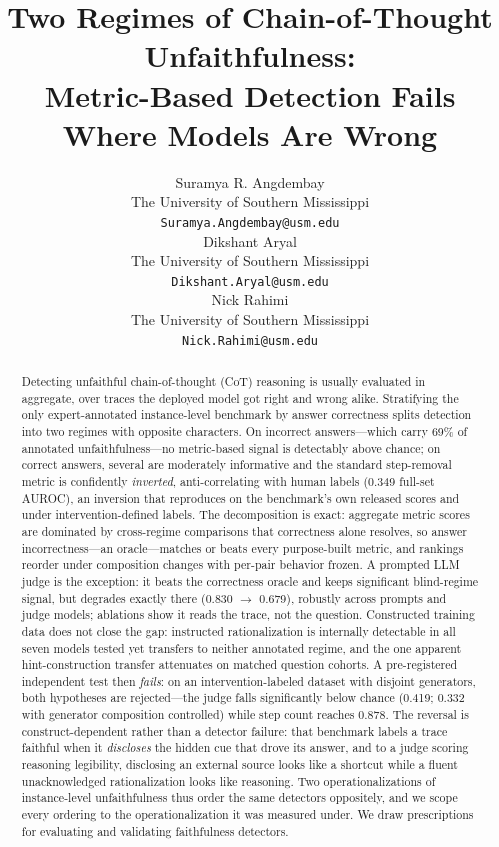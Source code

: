 \documentclass[11pt]{article}
\title{Two Regimes of Chain-of-Thought Unfaithfulness:\\Metric-Based Detection Fails Where Models Are Wrong}
\author{Suramya R. Angdembay \\
  The University of Southern Mississippi \\
  \texttt{Suramya.Angdembay@usm.edu} \\\And
  Dikshant Aryal \\
  The University of Southern Mississippi \\
  \texttt{Dikshant.Aryal@usm.edu} \\\And
  Nick Rahimi \\
  The University of Southern Mississippi \\
  \texttt{Nick.Rahimi@usm.edu} \\}
\begin{document}
\maketitle

\begin{abstract}
Detecting unfaithful chain-of-thought (CoT) reasoning is usually evaluated in aggregate, over traces the deployed model got right and wrong alike. Stratifying the only expert-annotated instance-level benchmark by answer correctness splits detection into two regimes with opposite characters. On incorrect answers---which carry 69\% of annotated unfaithfulness---no metric-based signal is detectably above chance; on correct answers, several are moderately informative and the standard step-removal metric is confidently \emph{inverted}, anti-correlating with human labels (0.349 full-set AUROC), an inversion that reproduces on the benchmark's own released scores and under intervention-defined labels. The decomposition is exact: aggregate metric scores are dominated by cross-regime comparisons that correctness alone resolves, so answer incorrectness---an oracle---matches or beats every purpose-built metric, and rankings reorder under composition changes with per-pair behavior frozen. A prompted LLM judge is the exception: it beats the correctness oracle and keeps significant blind-regime signal, but degrades exactly there (0.830 $\to$ 0.679), robustly across prompts and judge models; ablations show it reads the trace, not the question. Constructed training data does not close the gap: instructed rationalization is internally detectable in all seven models tested yet transfers to neither annotated regime, and the one apparent hint-construction transfer attenuates on matched question cohorts. A pre-registered independent test then \emph{fails}: on an intervention-labeled dataset with disjoint generators, both hypotheses are rejected---the judge falls significantly below chance (0.419; 0.332 with generator composition controlled) while step count reaches 0.878. The reversal is construct-dependent rather than a detector failure: that benchmark labels a trace faithful when it \emph{discloses} the hidden cue that drove its answer, and to a judge scoring reasoning legibility, disclosing an external source looks like a shortcut while a fluent unacknowledged rationalization looks like reasoning. Two operationalizations of instance-level unfaithfulness thus order the same detectors oppositely, and we scope every ordering to the operationalization it was measured under. We draw prescriptions for evaluating and validating faithfulness detectors.
\end{abstract}
\end{document}
